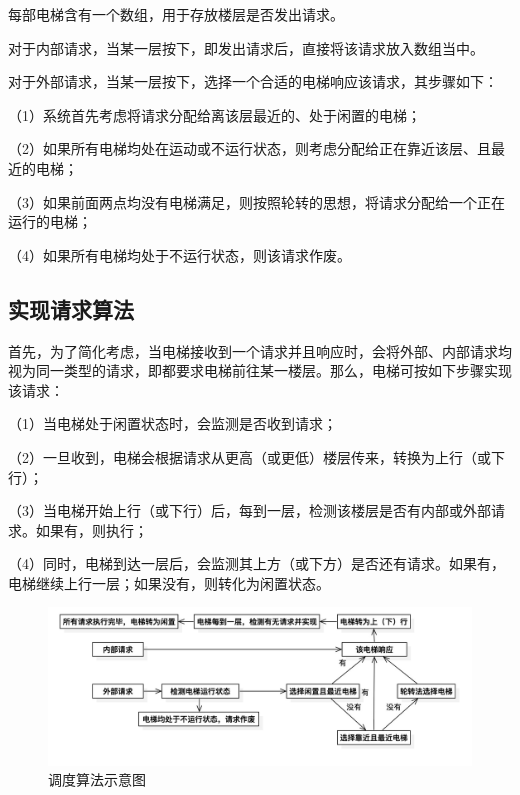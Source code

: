 \documentclass{article}
\begin{document}
\begin{CJK}{UTF8}{gbsn}
每部电梯含有一个数组，用于存放楼层是否发出请求。

对于内部请求，当某一层按下，即发出请求后，直接将该请求放入数组当中。

\clearpage

对于外部请求，当某一层按下，选择一个合适的电梯响应该请求，其步骤如下：

（1）系统首先考虑将请求分配给离该层最近的、处于闲置的电梯；

（2）如果所有电梯均处在运动或不运行状态，则考虑分配给正在靠近该层、且最近的电梯；

（3）如果前面两点均没有电梯满足，则按照轮转的思想，将请求分配给一个正在运行的电梯；

（4）如果所有电梯均处于不运行状态，则该请求作废。

\subsection{实现请求算法}

首先，为了简化考虑，当电梯接收到一个请求并且响应时，会将外部、内部请求均视为同一类型的请求，即都要求电梯前往某一楼层。那么，电梯可按如下步骤实现该请求：

（1）当电梯处于闲置状态时，会监测是否收到请求；

（2）一旦收到，电梯会根据请求从更高（或更低）楼层传来，转换为上行（或下行）；

（3）当电梯开始上行（或下行）后，每到一层，检测该楼层是否有内部或外部请求。如果有，则执行；

（4）同时，电梯到达一层后，会监测其上方（或下方）是否还有请求。如果有，电梯继续上行一层；如果没有，则转化为闲置状态。

\vspace{3em}


\begin{figure}[!h]
\centering
\includegraphics[width=1.1\textwidth]{1.jpg}
\caption{调度算法示意图}
\end{figure}






\end{CJK}
\end{document}
